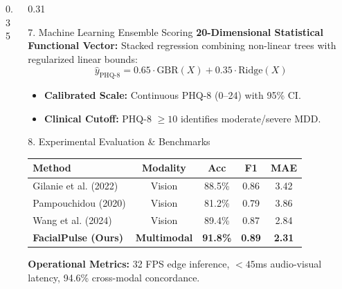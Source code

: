 \documentclass[final]{beamer}
\begin{document}
\begin{frame}[t]
\begin{columns}[t]
\begin{column}{0.35\textwidth}
  \end{column}

  \begin{column}{0.31\textwidth}

    \begin{posterbox}{7. Machine Learning Ensemble Scoring}
      \textbf{20-Dimensional Statistical Functional Vector:}
      Stacked regression combining non-linear trees with regularized linear bounds:
      \[
        \hat{y}_{\text{PHQ-8}} = 0.65 \cdot \text{GBR}(X) + 0.35 \cdot \text{Ridge}(X)
      \]
      \begin{itemize}
        \item \textbf{Calibrated Scale:} Continuous PHQ-8 (0--24) with 95\% CI.
        \item \textbf{Clinical Cutoff:} PHQ-8 $\ge 10$ identifies moderate/severe MDD.
      \end{itemize}
    \end{posterbox}

    \vspace{0.3cm}

    \begin{posterbox}{8. Experimental Evaluation \& Benchmarks}
      \begin{center}
      \small
      \begin{tabular}{lcccc}
        \toprule
        \textbf{Method} & \textbf{Modality} & \textbf{Acc} & \textbf{F1} & \textbf{MAE} \\
        \midrule
        Gilanie et al. (2022) & Vision & 88.5\% & 0.86 & 3.42 \\
        Pampouchidou (2020) & Vision & 81.2\% & 0.79 & 3.86 \\
        Wang et al. (2024) & Vision & 89.4\% & 0.87 & 2.84 \\
        \textbf{FacialPulse (Ours)} & \textbf{Multimodal} & \textbf{91.8\%} & \textbf{0.89} & \textbf{2.31} \\
        \bottomrule
      \end{tabular}
      \end{center}
      \vspace{0.1cm}
      \footnotesize \textbf{Operational Metrics:} 32 FPS edge inference, $<45$ms audio-visual latency, 94.6\% cross-modal concordance.
    \end{posterbox}

    \vspace{0.3cm}


\end{column}
\end{columns}
\end{frame}
\end{document}
